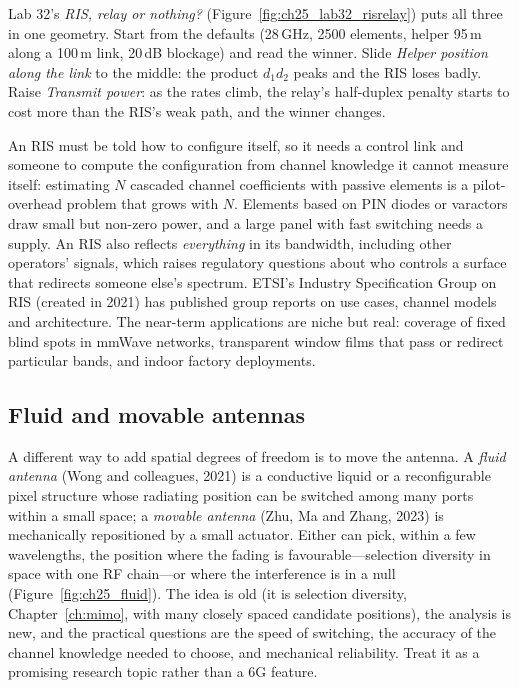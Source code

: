 \begin{tryit}
Lab 32's \emph{RIS, relay or nothing?} (Figure~\ref{fig:ch25_lab32_risrelay}) puts all three in one
geometry. Start from the defaults
(28\,GHz, 2500 elements, helper 95\,m along a 100\,m link, 20\,dB blockage) and read the winner.
Slide \emph{Helper position along the link} to the middle: the product $d_1d_2$ peaks and the RIS
loses badly. Raise \emph{Transmit power}: as the rates climb, the relay's half-duplex penalty starts
to cost more than the RIS's weak path, and the winner changes.
\end{tryit}

\begin{inpractice}
An RIS must be told how to configure itself, so it needs a control link and someone to compute the
configuration from channel knowledge it cannot measure itself: estimating $N$ cascaded channel
coefficients with passive elements is a pilot-overhead problem that grows with $N$. Elements based on
PIN diodes or varactors draw small but non-zero power, and a large panel with fast switching needs a
supply. An RIS also reflects \emph{everything} in its bandwidth, including other operators' signals,
which raises regulatory questions about who controls a surface that redirects someone else's
spectrum. ETSI's Industry Specification Group on RIS (created in 2021) has published group reports on
use cases, channel models and architecture. The near-term applications are niche but real: coverage
of fixed blind spots in mmWave networks, transparent window films that pass or redirect particular
bands, and indoor factory deployments.
\end{inpractice}

\subsection{Fluid and movable antennas}


A different way to add spatial degrees of freedom is to move the antenna. A \emph{fluid antenna}
(Wong and colleagues, 2021) is a conductive liquid or a reconfigurable pixel structure whose radiating
position can be switched among many ports within a small space; a \emph{movable antenna} (Zhu, Ma and
Zhang, 2023) is mechanically repositioned by a small actuator. Either can pick, within a few
wavelengths, the position where the fading is favourable---selection diversity in space with one RF
chain---or where the interference is in a null (Figure~\ref{fig:ch25_fluid}). The idea is old (it is selection diversity, Chapter~\ref{ch:mimo},
with many closely spaced candidate positions), the analysis is new, and the practical questions are the speed of switching,
the accuracy of the channel knowledge needed to choose, and mechanical reliability. Treat it as a
promising research topic rather than a 6G feature.

